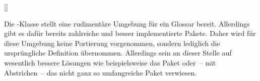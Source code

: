 \begin{Declaration*}{}
\begin{Declaration}{[]}
\begin{Declaration}{}
\printdeclarationlist*%
%
Die -Klasse stellt eine rudimentäre Umgebung für ein Glossar 
bereit. Allerdings gibt es dafür bereits zahlreiche und besser implementierte 
Pakete. Daher wird für diese Umgebung keine Portierung vorgenommen, sondern 
lediglich die ursprüngliche Definition übernommen. Allerdings sein an dieser 
Stelle auf wesentlich bessere Lösungen wie beispielsweise das Paket 
 oder~-- mit Abstrichen~-- das nicht ganz so umfangreiche 
Paket  verwiesen. 
\end{Declaration}
\end{Declaration}
\end{Declaration*}